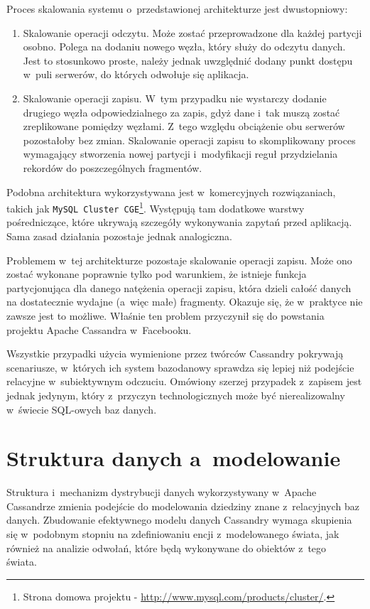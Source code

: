 Proces skalowania systemu o~przedstawionej architekturze jest dwustopniowy:

\begin{enumerate}
	\item Skalowanie operacji odczytu. Może zostać przeprowadzone dla każdej partycji osobno. Polega na dodaniu nowego węzła, który służy do odczytu danych. Jest to stosunkowo proste, należy jednak uwzględnić dodany punkt dostępu w~puli serwerów, do których odwołuje się aplikacja.
	\item Skalowanie operacji zapisu. W~tym przypadku nie wystarczy dodanie drugiego węzła odpowiedzialnego za zapis, gdyż dane i~tak muszą zostać zreplikowane pomiędzy węzłami. Z~tego względu obciążenie obu serwerów pozostałoby bez zmian. Skalowanie operacji zapisu to skomplikowany proces wymagający stworzenia nowej partycji i~modyfikacji reguł przydzielania rekordów do poszczególnych fragmentów. 
\end{enumerate}

Podobna architektura wykorzystywana jest w~komercyjnych rozwiązaniach, takich jak \verb+MySQL Cluster CGE+\footnote{Strona domowa projektu - \url{http://www.mysql.com/products/cluster/}.}. Występują tam dodatkowe warstwy pośredniczące, które ukrywają szczegóły wykonywania zapytań przed aplikacją. Sama zasad działania pozostaje jednak analogiczna.

Problemem w~tej architekturze pozostaje skalowanie operacji zapisu. Może ono zostać wykonane poprawnie tylko pod warunkiem, że istnieje funkcja partycjonująca dla danego natężenia operacji zapisu, która dzieli całość danych na dostatecznie wydajne (a~więc małe) fragmenty. Okazuje się, że w~praktyce nie zawsze jest to możliwe. Właśnie ten problem przyczynił się do powstania projektu Apache Cassandra w~Facebooku. 

Wszystkie przypadki użycia wymienione przez twórców Cassandry pokrywają scenariusze, w~których ich system bazodanowy sprawdza się lepiej niż podejście relacyjne w~subiektywnym odczuciu. Omówiony szerzej przypadek z~zapisem jest jednak jedynym, który z~przyczyn technologicznych może być nierealizowalny w~świecie SQL-owych baz danych.

\section{Struktura danych a~modelowanie}
\label{sec:relative_vs_cassandra_model}

Struktura i~mechanizm dystrybucji danych wykorzystywany w~Apache Cassandrze zmienia podejście do modelowania dziedziny znane z~relacyjnych baz danych. Zbudowanie efektywnego modelu danych Cassandry wymaga skupienia się w~podobnym stopniu na zdefiniowaniu encji z~modelowanego świata, jak również na analizie odwołań, które będą wykonywane do obiektów z~tego świata.~\cite{modeling_best_practices_pt_1}

